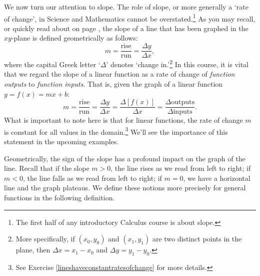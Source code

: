 We now turn our attention to slope.  The role of slope, or more generally a `rate of change',  in Science and Mathematics  cannot be overstated.\footnote{The first half of any introductory Calculus course is about slope.} As you may recall, or quickly read about on page \pageref{slope}, the slope of a line that has been graphed in the $xy$-plane is defined geometrically as follows: \[m = \dfrac{\text{rise}}{\text{run}} = \dfrac{\Delta y}{\Delta x} ,\] where the capital Greek letter  `$\Delta$' denotes `change in.'\footnote{More specifically, if $(x_{0}, y_{0})$ and $(x_{1}, y_{1})$ are two distinct points in the plane, then $\Delta x = x_{1} - x_{0}$ and $\Delta y = y_{1} - y_{0}$.} In this course, it is vital that we regard the slope of a linear function as a  rate of change of \textit{function outputs}  to \textit{function inputs}.  That is, given the graph of a linear function $y = f(x) = mx + b$:   \[ m = \dfrac{\text{rise}}{\text{run}} = \dfrac{\Delta y}{\Delta x} = \dfrac{\Delta [f(x)]}{\Delta x} = \dfrac{\Delta \text{outputs}}{\Delta \text{inputs}}. \]  What is important to note here is that for linear functions, the rate of change $m$ is constant for all values in the domain.\footnote{See Exercise \ref{lineshaveconstantratesofchange} for more details.}  We'll see the importance of this statement in the upcoming examples.

\medskip

Geometrically, the sign of the slope has a profound impact on the graph of the line.  Recall that if the slope $m > 0$, the line rises as we read from left to right;   if $m<0$, the line falls as we read from left to right; if $m=0$, we have a horizontal line and the graph plateaus.  We define these notions more precisely for general functions in the following definition.

